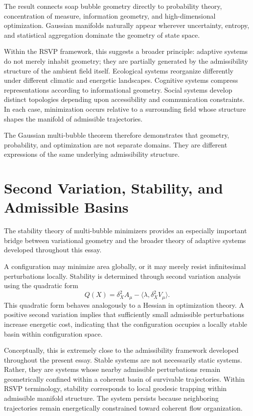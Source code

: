 \documentclass[11pt,a4paper]{article}
\begin{document}
The result connects soap bubble geometry directly to probability theory, concentration of measure, information geometry, and high-dimensional optimization. Gaussian manifolds naturally appear wherever uncertainty, entropy, and statistical aggregation dominate the geometry of state space.

Within the RSVP framework, this suggests a broader principle: adaptive systems do not merely inhabit geometry; they are partially generated by the admissibility structure of the ambient field itself. Ecological systems reorganize differently under different climatic and energetic landscapes. Cognitive systems compress representations according to informational geometry. Social systems develop distinct topologies depending upon accessibility and communication constraints. In each case, minimization occurs relative to a surrounding field whose structure shapes the manifold of admissible trajectories.

The Gaussian multi-bubble theorem therefore demonstrates that geometry, probability, and optimization are not separate domains. They are different expressions of the same underlying admissibility structure.

\newpage

\section{Second Variation, Stability, and Admissible Basins}

The stability theory of multi-bubble minimizers provides an especially important bridge between variational geometry and the broader theory of adaptive systems developed throughout this essay.

A configuration may minimize area globally, or it may merely resist infinitesimal perturbations locally. Stability is determined through second variation analysis using the quadratic form
\[
Q(X)
=
\delta_X^2 A_\mu
-
\langle \lambda,\delta_X^2 V_\mu\rangle.
\]
This quadratic form behaves analogously to a Hessian in optimization theory. A positive second variation implies that sufficiently small admissible perturbations increase energetic cost, indicating that the configuration occupies a locally stable basin within configuration space.

Conceptually, this is extremely close to the admissibility framework developed throughout the present essay. Stable systems are not necessarily static systems. Rather, they are systems whose nearby admissible perturbations remain geometrically confined within a coherent basin of survivable trajectories. Within RSVP terminology, stability corresponds to local geodesic trapping within admissible manifold structure. The system persists because neighboring trajectories remain energetically constrained toward coherent flow organization.
\end{document}
